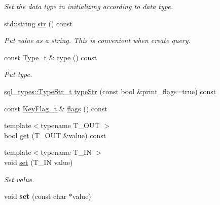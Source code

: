 \begin{DoxyCompactItemize}
\begin{DoxyCompactList}\small\item\em Set the data type in initializing according to data type. \end{DoxyCompactList}\item 
\mbox{\label{classsf_1_1Data_a7e0adbd3c15928e2e98829c6aa3955ba}} 
std\+::string \hyperlink{classsf_1_1Data_a7e0adbd3c15928e2e98829c6aa3955ba}{str} () const
\begin{DoxyCompactList}\small\item\em Put value as a string. This is convenient when create query. \end{DoxyCompactList}\item 
\mbox{\label{classsf_1_1Data_ae7321e2f6bb059074d30ddddcdd7409d}} 
const \hyperlink{namespacesf_aee849ddcdbf3bdb22d912e4ab0c7b93f}{Type\+\_\+t} \& \hyperlink{classsf_1_1Data_ae7321e2f6bb059074d30ddddcdd7409d}{type} () const
\begin{DoxyCompactList}\small\item\em Put type. \end{DoxyCompactList}\item 
\hyperlink{namespacesf_1_1sql__types_a1a4f114cdf79706d2298e3454006e65b}{sql\+\_\+types\+::\+Type\+Str\+\_\+t} \hyperlink{classsf_1_1Data_a3035efa0296877d2ae01ae64733dd2e2}{type\+Str} (const bool \&print\+\_\+flags=true) const
\item 
const \hyperlink{namespacesf_ab38d6ab0cbacec81e7d09c0d53feb958}{Key\+Flag\+\_\+t} \& \hyperlink{classsf_1_1Data_ab57c8e4cea0ce97e16f14412748e28aa}{flags} () const
\item 
{\footnotesize template$<$typename T\+\_\+\+O\+UT $>$ }\\bool \hyperlink{classsf_1_1Data_a059208eaed62d30be3abe34276441740}{get} (T\+\_\+\+O\+UT \&value) const
\item 
{\footnotesize template$<$typename T\+\_\+\+IN $>$ }\\void \hyperlink{classsf_1_1Data_a1544ae4ac13d303ba2e791d12a917737}{set} (T\+\_\+\+IN value)
\begin{DoxyCompactList}\small\item\em Set value. \end{DoxyCompactList}\item 
\mbox{\label{classsf_1_1Data_a7034d44cdf6bac324068e4b0f3fe8f7c}} 
void {\bfseries set} (const char $\ast$value)

\end{DoxyCompactItemize}
